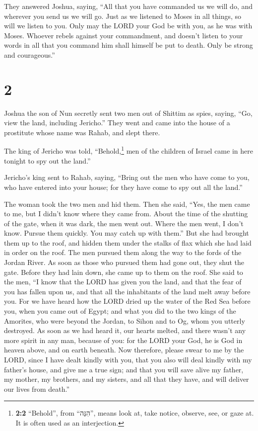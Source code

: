  They answered Joshua, saying, ``All that you have
commanded us we will do, and wherever you send us we will go.
 Just as we listened to Moses in all things, so will we
listen to you. Only may the LORD your God be with you, as he was with
Moses.  Whoever rebels against your commandment, and
doesn't listen to your words in all that you command him shall himself
be put to death. Only be strong and courageous.''

\hypertarget{section-1}{%
\section{2}\label{section-1}}

 Joshua the son of Nun secretly sent two men out of
Shittim as spies, saying, ``Go, view the land, including Jericho.'' They
went and came into the house of a prostitute whose name was Rahab, and
slept there.

 The king of Jericho was told, ``Behold,\footnote{\textbf{2:2}
  ``Behold'', from ``הִנֵּה'', means look at, take notice, observe, see,
  or gaze at. It is often used as an interjection.} men of the children
of Israel came in here tonight to spy out the land.''

 Jericho's king sent to Rahab, saying, ``Bring out the men
who have come to you, who have entered into your house; for they have
come to spy out all the land.''

 The woman took the two men and hid them. Then she said,
``Yes, the men came to me, but I didn't know where they came from.
 About the time of the shutting of the gate, when it was
dark, the men went out. Where the men went, I don't know. Pursue them
quickly. You may catch up with them.''  But she had
brought them up to the roof, and hidden them under the stalks of flax
which she had laid in order on the roof.  The men pursued
them along the way to the fords of the Jordan River. As soon as those
who pursued them had gone out, they shut the gate.  Before
they had lain down, she came up to them on the roof.  She
said to the men, ``I know that the LORD has given you the land, and that
the fear of you has fallen upon us, and that all the inhabitants of the
land melt away before you.  For we have heard how the
LORD dried up the water of the Red Sea before you, when you came out of
Egypt; and what you did to the two kings of the Amorites, who were
beyond the Jordan, to Sihon and to Og, whom you utterly destroyed.
 As soon as we had heard it, our hearts melted, and there
wasn't any more spirit in any man, because of you: for the LORD your
God, he is God in heaven above, and on earth beneath. 
Now therefore, please swear to me by the LORD, since I have dealt kindly
with you, that you also will deal kindly with my father's house, and
give me a true sign;  and that you will save alive my
father, my mother, my brothers, and my sisters, and all that they have,
and will deliver our lives from death.''

